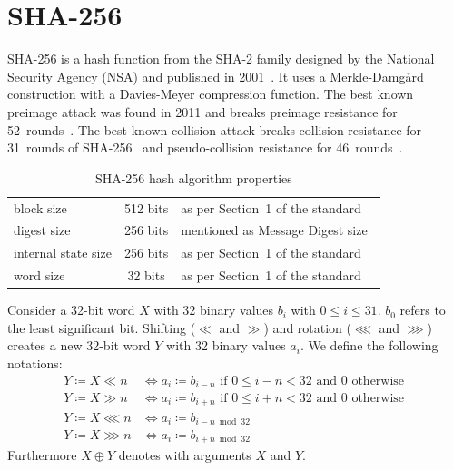 \section{SHA-256}
\label{sec:dc-sha-256}
%
SHA-256 is a hash function from the SHA-2 family designed by the National Security Agency (NSA)
and published in 2001~\cite{fips-pub-180-4}. It uses a Merkle-Damg\aa{}rd construction
with a Davies-Meyer compression function. The best known preimage attack was found in 2011
and breaks preimage resistance for 52~rounds~\cite{bicliques}. The best known collision attack
breaks collision resistance for 31~rounds of SHA-256~\cite{improving} and pseudo-collision
resistance for 46~rounds~\cite{high2011}.

\begin{table}[!hb]
  \begin{center}
    \begin{tabular}{lcl}
      block size           & 512 bits   & as per Section~1 of the standard~\cite{fips-pub-180-4} \\
      digest size          & 256 bits   & mentioned as Message Digest size~\cite{fips-pub-180-4} \\
      internal state size  & 256 bits   & as per Section~1 of the standard~\cite{fips-pub-180-4} \\
      word size            & 32 bits    & as per Section~1 of the standard~\cite{fips-pub-180-4}
    \end{tabular}
    \caption{SHA-256 hash algorithm properties}
    \label{tab:sha256}
  \end{center}
\end{table}
%
\begin{defi}
  \label{def:shifts}
  Consider a 32-bit word $X$ with 32 binary values $b_i$ with $0 \leq i \leq 31$.
  $b_0$ refers to the least significant bit. Shifting ($≪$ and $≫$) and
  rotation ($⋘$ and $⋙$) creates a new 32-bit word $Y$ with 32 binary values $a_i$.
  We define the following notations:
  \begin{align*}
    Y \coloneqq X ≪ n  &\iff a_i \coloneqq b_{i-n} \text{ if } 0 \leq i-n < 32 \text{ and } 0 \text{ otherwise } \\
    Y \coloneqq X ≫ n  &\iff a_i \coloneqq b_{i+n} \text{ if } 0 \leq i+n < 32 \text{ and } 0 \text{ otherwise } \\
    Y \coloneqq X ⋘ n  &\iff a_i \coloneqq b_{i-n \bmod{32}} \\
    Y \coloneqq X ⋙ n  &\iff a_i \coloneqq b_{i+n \bmod{32}}
  \end{align*}
  Furthermore $X \oplus Y$ denotes  with arguments $X$ and $Y$.
\end{defi}
